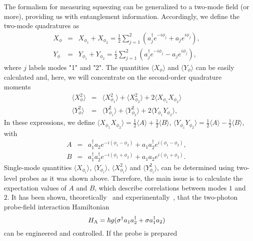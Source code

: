 \documentclass[pra,aps,twocolumn,showpacs]{revtex4}
\begin{document}
The formalism for measuring squeezing can be generalized to a
two-mode field (or more), providing us with entanglement
information. Accordingly, we define the two-mode quadratures as
\begin{eqnarray}
X_{\phi} & = & X_{\phi_1} + X_{\phi_2} =
\frac{1}{2}\sum^{2}_{j=1}(a_{j}^{\dagger}e^{-i \phi_j} +
a_{j}e^{i \phi_j}) , \\
Y_{\phi} & = & Y_{\phi_1} + Y_{\phi_2} =
\frac{i}{2}\sum^{2}_{j=1}(a_{j}^{\dagger}e^{-i\phi_j} -
a_{j}e^{i\phi_j}),
\end{eqnarray}
where $j$ labels modes "1" and "2". The quantities $\langle
X_{\phi} \rangle$ and $\langle Y_{\phi} \rangle$ can be easily
calculated and, here, we will concentrate on the second-order
quadrature moments
\begin{eqnarray}
\langle X_{\phi}^{2} \rangle & = & \langle X_{\phi_1}^{2} \rangle
+ \langle X_{\phi_2}^{2}
\rangle + 2 \langle X_{\phi_1}X_{\phi_2} \rangle  \\
\langle Y_{\phi}^{2} \rangle & = & \langle Y_{\phi_1}^{2} \rangle
+ \langle Y_{\phi_2}^{2} \rangle + 2 \langle Y_{\phi_1} Y_{\phi_2}
\rangle,
\end{eqnarray}
In these expressions, we define $\langle X_{\phi_1} X_{\phi_2}
\rangle = \frac{1}{2} \langle A \rangle + \frac{1}{2} \langle B
\rangle$, $\langle Y_{\phi_1} Y_{\phi_2} \rangle =  \frac{1}{2}
\langle A \rangle - \frac{1}{2} \langle B \rangle$, with
\begin{eqnarray}
\label{quantA}A & = &
a_{1}^{\dagger}a_{2}e^{-i(\phi_{1}-\phi_{2})} +
a_{1}a_{2}^{\dagger}e^{i(\phi_{1}-\phi_{2})} , \\
\label{quantB}B & = &
a_{1}^{\dagger}a_{2}^{\dagger}e^{-i(\phi_{1}+\phi_{2})} +
a_{1}a_{2}e^{i(\phi_{1}+\phi_{2})} .
\end{eqnarray}
Single-mode quantities $\langle X_{\phi_i} \rangle$, $\langle
Y_{\phi_i} \rangle$, $\langle X_{\phi_i}^{2} \rangle$ and $\langle
Y_{\phi_i}^{2} \rangle$, can be determined using two-level probes
as it was shown above. Therefore, the main issue is to calculate
the expectation values of $A$ and $B$, which describe correlations
between modes $1$ and $2$. It has been shown,
theoretically~\cite{Neto} and experimentally~\cite{Haroche}, that
the two-photon probe-field interaction Hamiltonian
\begin{equation}\label{interHA}
H_{\rm A} = \hbar g(\sigma^{\dagger}a_{1}a_{2}^{\dagger} + \sigma
a_{1}^{\dagger}a_{2})
\end{equation}
can be engineered and controlled. If the probe is prepared
\end{document}
